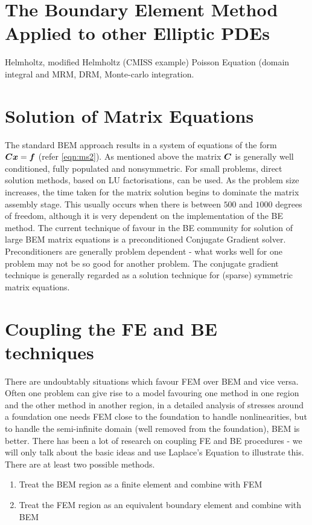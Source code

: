 \section{The Boundary Element Method Applied to other Elliptic PDEs}

Helmholtz, modified Helmholtz (CMISS example) Poisson Equation (domain
integral and MRM, DRM, Monte-carlo integration.


\section{Solution of Matrix Equations}

The standard BEM approach results in a system of equations of the form
 $\matr{C}\vect{x} = \vect{f}$ (refer \eqref{eqn:ms2}).  As mentioned above the
matrix $\matr{C}$ is generally well conditioned, fully populated and
nonsymmetric.  For small problems, direct solution methods, based on LU
factorisations, can be used.  As the problem size increases, the time taken for
the matrix solution begins to dominate the matrix assembly stage.  This
usually occurs when there is between $500$ and $1000$ degrees of freedom, although
it is very dependent on the implementation of the BE method.  The current
technique of favour in the BE community for solution of large BEM matrix
equations is a preconditioned Conjugate Gradient solver. Preconditioners are
generally problem dependent - what works well for one problem may not be so
good for another problem.  The conjugate gradient technique is generally
regarded as a solution technique for (sparse) symmetric matrix equations. 


\section{Coupling the FE and BE techniques}

There are undoubtably situations which favour FEM over BEM and vice versa.
Often one problem can give rise to a model favouring one method in one region
and the other method in another region, \eg in a detailed analysis of stresses
around a foundation one needs FEM close to the foundation to handle
nonlinearities, but to handle the semi-infinite domain (well removed from the
foundation), BEM is better.  There has been a lot of research on coupling FE
and BE procedures - we will only talk about the basic ideas and use Laplace's
Equation to illustrate this.  There are at least two possible methods.  
\begin{enumerate}
\item Treat the BEM region as a finite element and combine with FEM
\item Treat the FEM region as an equivalent boundary element and combine with
  BEM
\end{enumerate}

